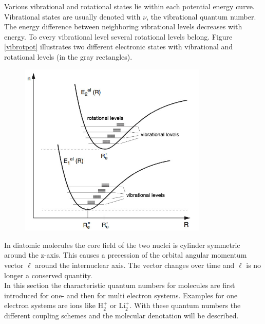 \documentclass[parskip,12pt,headsepline,a4paper] {scrbook}
\begin{document}
Various vibrational and rotational states lie within each potential energy curve. Vibrational states are usually denoted with $\nu$, the vibrational quantum number. The energy difference between neighboring vibrational levels decreases with energy. To every vibrational level several rotational levels belong. Figure \ref{vibrotpot} illustrates two different electronic states with vibrational and rotational levels (in the gray rectangles).

\begin{figure}[ht]
\centerline{
\includegraphics[width=9cm]{./spectroscopy/vib-rot-pot.jpg}}
\end{figure}



In diatomic molecules the core field of the two nuclei is cylinder symmetric around the z-axis. This causes a precession of the orbital angular momentum vector $\boldsymbol{\ell}$ around the internuclear axis. The vector changes over time and $\boldsymbol{\ell}$ is no longer a conserved quantity. \\
In this section the characteristic quantum numbers for molecules are first introduced for one- and then for multi electron systems. Examples for one electron systems are ions like H$^+_2$ or Li$^+_2$. With these quantum numbers the different coupling schemes and the molecular denotation will be described.
\end{document}
